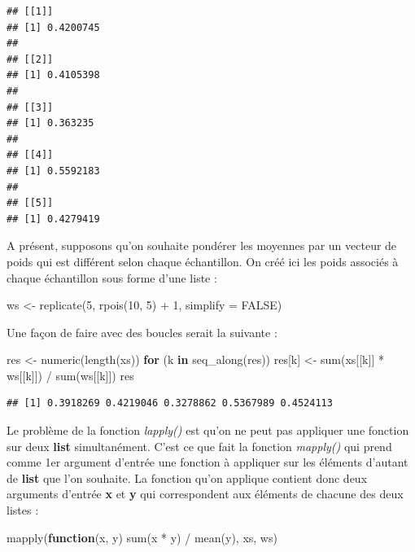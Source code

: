 \documentclass[
]{book}
\newenvironment{Shaded}{\begin{snugshade}}{\end{snugshade}}
\newcommand{\AttributeTok}[1]{\textcolor[rgb]{0.77,0.63,0.00}{#1}}
\newcommand{\ConstantTok}[1]{\textcolor[rgb]{0.00,0.00,0.00}{#1}}
\newcommand{\ControlFlowTok}[1]{\textcolor[rgb]{0.13,0.29,0.53}{\textbf{#1}}}
\newcommand{\DecValTok}[1]{\textcolor[rgb]{0.00,0.00,0.81}{#1}}
\newcommand{\FunctionTok}[1]{\textcolor[rgb]{0.00,0.00,0.00}{#1}}
\newcommand{\NormalTok}[1]{#1}
\newcommand{\OtherTok}[1]{\textcolor[rgb]{0.56,0.35,0.01}{#1}}
\newcommand{\SpecialCharTok}[1]{\textcolor[rgb]{0.00,0.00,0.00}{#1}}
\theoremstyle{definition}
\theoremstyle{definition}
\theoremstyle{definition}
\theoremstyle{definition}
\theoremstyle{remark}
\begin{document}
\begin{verbatim}
## [[1]]
## [1] 0.4200745
## 
## [[2]]
## [1] 0.4105398
## 
## [[3]]
## [1] 0.363235
## 
## [[4]]
## [1] 0.5592183
## 
## [[5]]
## [1] 0.4279419
\end{verbatim}

A présent, supposons qu'on souhaite pondérer les moyennes par un vecteur de poids qui est différent selon chaque échantillon. On créé ici les poids associés à chaque échantillon sous forme d'une liste :

\begin{Shaded}
\begin{Highlighting}[]
\NormalTok{ws }\OtherTok{\textless{}{-}} \FunctionTok{replicate}\NormalTok{(}\DecValTok{5}\NormalTok{, }\FunctionTok{rpois}\NormalTok{(}\DecValTok{10}\NormalTok{, }\DecValTok{5}\NormalTok{) }\SpecialCharTok{+} \DecValTok{1}\NormalTok{, }\AttributeTok{simplify =} \ConstantTok{FALSE}\NormalTok{)}
\end{Highlighting}
\end{Shaded}

Une façon de faire avec des boucles serait la suivante :

\begin{Shaded}
\begin{Highlighting}[]
\NormalTok{res }\OtherTok{\textless{}{-}} \FunctionTok{numeric}\NormalTok{(}\FunctionTok{length}\NormalTok{(xs))}
\ControlFlowTok{for}\NormalTok{ (k }\ControlFlowTok{in} \FunctionTok{seq\_along}\NormalTok{(res))}
\NormalTok{  res[k] }\OtherTok{\textless{}{-}} \FunctionTok{sum}\NormalTok{(xs[[k]] }\SpecialCharTok{*}\NormalTok{ ws[[k]]) }\SpecialCharTok{/} \FunctionTok{sum}\NormalTok{(ws[[k]])}
\NormalTok{res}
\end{Highlighting}
\end{Shaded}

\begin{verbatim}
## [1] 0.3918269 0.4219046 0.3278862 0.5367989 0.4524113
\end{verbatim}

Le problème de la fonction \emph{lapply()} est qu'on ne peut pas appliquer une fonction sur deux \textbf{list} simultanément. C'est ce que fait la fonction \emph{mapply()} qui prend comme 1er argument d'entrée une fonction à appliquer sur les éléments d'autant de \textbf{list} que l'on souhaite. La fonction qu'on applique contient donc deux arguments d'entrée \textbf{x} et \textbf{y} qui correspondent aux éléments de chacune des deux listes :

\begin{Shaded}
\begin{Highlighting}[]
\FunctionTok{mapply}\NormalTok{(}\ControlFlowTok{function}\NormalTok{(x, y) }\FunctionTok{sum}\NormalTok{(x }\SpecialCharTok{*}\NormalTok{ y) }\SpecialCharTok{/} \FunctionTok{mean}\NormalTok{(y), xs, ws)}
\end{Highlighting}
\end{Shaded}
\end{document}
